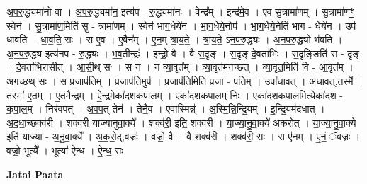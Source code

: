 \documentclass[17pt]{extarticle}
\begin{document}
अ॒प॒रु॒द्ध्यमा॑नो वा । अ॒प॒रु॒द्ध्यमा॑न॒ इत्य॑प - रु॒द्ध्यमा॑नः । वेन्द्र᳚म् । इन्द्र॑मे॒व । ए॒व सु॒त्रामा॑णम् । सु॒त्रामा॑णꣳ॒॒ स्वेन॑ । सु॒त्रामा॑ण॒मिति॑ सु - त्रामा॑णम् । स्वेन॑ भाग॒धेये॑न । भा॒ग॒धेये॒नोप॑ । भा॒ग॒धेये॒नेति॑ भाग - धेये॑न । उप॑ धावति । धा॒व॒ति॒ सः । स ए॒व । ए॒वैन᳚म् । ए॒न॒म् त्रा॒य॒ते॒ । त्रा॒य॒ते॒ ऽन॒प॒रु॒द्ध्यः । अ॒न॒प॒रु॒द्ध्यो भ॑वति । अ॒न॒प॒रु॒द्ध्य इत्य॑नप - रु॒द्ध्यः । भ॒व॒तीन्द्रः॑ । इन्द्रो॒ वै । वै स॒दृङ् । स॒दृङ् दे॒वता॑भिः । स॒दृङ्ङिति॑ स - दृङ् । दे॒वता॑भिरासीत् । आ॒सी॒थ् सः । स न । न व्या॒वृत᳚म् । व्या॒वृत॑मगच्छत् । व्या॒वृत॒मिति॑ वि - आ॒वृत᳚म् । अ॒ग॒च्छ॒थ् सः । स प्र॒जाप॑तिम् । प्र॒जाप॑ति॒मुप॑ । प्र॒जाप॑ति॒मिति॑ प्र॒जा - प॒ति॒म् । उपा॑धावत् । अ॒धा॒व॒त्,तस्मै᳚ । तस्मा॑ ए॒तम् । ए॒तमै॒न्द्रम् । ऐ॒न्द्रमेका॑दशकपालम् । एका॑दशकपाल॒म् निः । एका॑दशकपाल॒मित्येका॑दश - क॒पा॒ल॒म् । निर॑वपत् । अ॒व॒प॒त् तेन॑ । तेनै॒व । ए॒वास्मिन्न्॑ । अ॒स्मि॒न्नि॒न्द्रि॒यम् । इ॒न्द्रि॒यम॑दधात् । अ॒द॒धा॒च्छक्व॑री । शक्व॑री याज्यानुवा॒क्ये᳚ । शक्व॑री॒ इति॒ शक्व॑री । या॒ज्या॒नु॒वा॒क्ये॑ अकरोत् । या॒ज्या॒नु॒वा॒क्ये॑ इति॑ याज्या - अ॒नु॒वा॒क्ये᳚ । अ॒क॒रो॒द्,वज्रः॑ । वज्रो॒ वै । वै शक्व॑री । शक्व॑री॒ सः । स ए॑नम् । ए॒नं॒ ॅवज्रः॑ । वज्रो॒ भूत्यै᳚ । भूत्या॑ ऐन्ध । ऐ॒न्ध॒ सः \newline

\textbf{Jatai Paata} \newline
\end{document}
